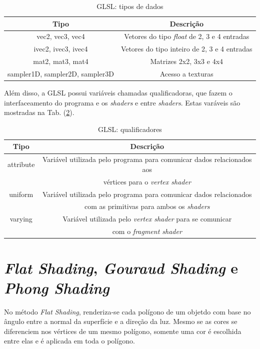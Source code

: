 \begin{table}[h]
	\centering	
	\begin{tabular}{cc}
		\toprule
		\textbf{Tipo} & \textbf{Descrição}  \\
		\midrule
		vec2, vec3, vec4 & Vetores do tipo \textit{float} de 2, 3 e 4 entradas \\
		ivec2, ivec3, ivec4 & Vetores do tipo inteiro de 2, 3 e 4 entradas \\
		mat2, mat3, mat4 & Matrizes 2x2, 3x3 e 4x4 \\
		sampler1D, sampler2D, sampler3D & Acesso a texturas \\
		\bottomrule
	\end{tabular}
	\caption{ GLSL: tipos de dados}
	\label{tiposglsl}
\end{table}

	Além disso, a GLSL possui variáveis chamadas qualificadoras, que fazem o interfaceamento do programa e os \textit{shaders} e entre \textit{shaders}. Estas varáveis são mostradas na Tab. (\ref{tiposqualificadores}).

	\begin{table}[h]
	\centering	
	\begin{tabular}{cc}
		\toprule
		\textbf{Tipo} & \textbf{Descrição}  \\
		\midrule
		attribute &  Variável utilizada pelo programa para comunicar dados relacionados aos \\
		               &  vértices para o \textit{vertex shader}\\
		uniform &  Variável utilizada pelo programa para comunicar dados relacionados \\
			&  com as primitivas para ambos os \textit{shaders} \\
		varying &  Variável utilizada pelo \textit{vertex shader} para se comunicar \\
			& com o \textit{fragment shader} \\
		\bottomrule
	\end{tabular}
	\caption{ GLSL: qualificadores}
	\label{tiposqualificadores}
	\end{table}

\section{\textit{Flat Shading}, \textit{Gouraud Shading} e \textit{Phong Shading}}

	No método \textit{Flat Shading}, renderiza-se cada polígono de um objetdo com base no ângulo entre a normal da superfície e a direção da luz. Mesmo se as cores se diferenciem nos vértices de um mesmo polígono, somente uma cor é escolhida entre elas e é aplicada em toda o polígono.  

